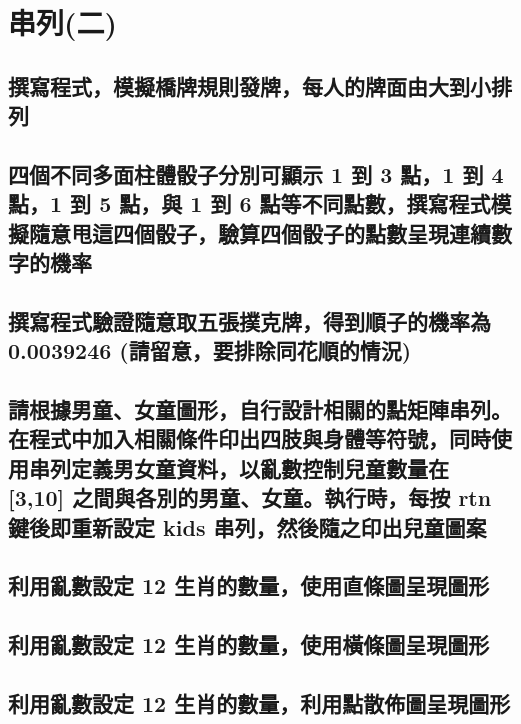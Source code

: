 \chapter{串列(二)}

\section{撰寫程式，模擬橋牌規則發牌，每人的牌面由大到小排列}


\section{四個不同多面柱體骰子分別可顯示 1 到 3 點，1 到 4 點，1 到 5 點，與 1 到 6 點等不同點數，撰寫程式模擬隨意甩這四個骰子，驗算四個骰子的點數呈現連續數字的機率}


\section{撰寫程式驗證隨意取五張撲克牌，得到順子的機率為 0.0039246 (請留意，要排除同花順的情況)}


\section{請根據男童、女童圖形，自行設計相關的點矩陣串列。在程式中加入相關條件印出四肢與身體等符號，同時使用串列定義男女童資料，以亂數控制兒童數量在 [3,10] 之間與各別的男童、女童。執行時，每按 rtn 鍵後即重新設定 kids 串列，然後隨之印出兒童圖案}


\section{利用亂數設定 12 生肖的數量，使用直條圖呈現圖形}


\section{利用亂數設定 12 生肖的數量，使用橫條圖呈現圖形}


\section{利用亂數設定 12 生肖的數量，利用點散佈圖呈現圖形}


